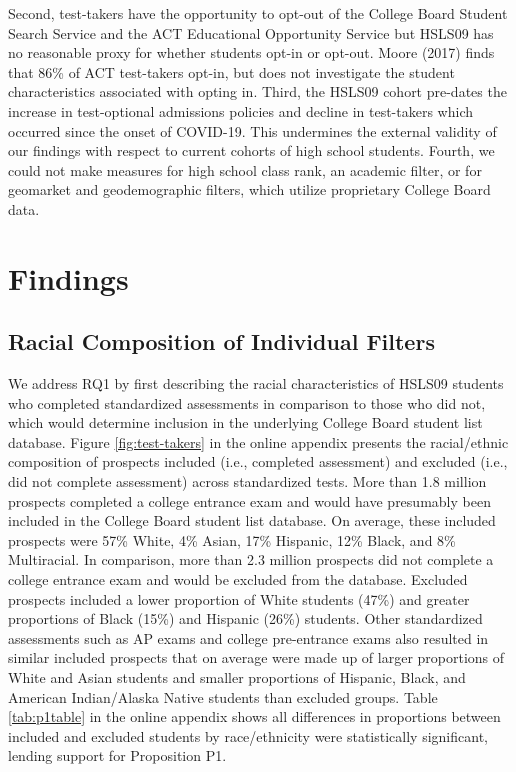 \documentclass[
  12pt,
]{article}
\begin{document}
Second, test-takers have the opportunity to opt-out of the College Board Student Search Service and the ACT Educational Opportunity Service but HSLS09 has no reasonable proxy for whether students opt-in or opt-out. Moore (2017) finds that 86\% of ACT test-takers opt-in, but does not investigate the student characteristics associated with opting in. Third, the HSLS09 cohort pre-dates the increase in test-optional admissions policies and decline in test-takers which occurred since the onset of COVID-19. This undermines the external validity of our findings with respect to current cohorts of high school students. Fourth, we could not make measures for high school class rank, an academic filter, or for geomarket and geodemographic filters, which utilize proprietary College Board data.

\hypertarget{findings}{%
\section{Findings}\label{findings}}

\hypertarget{racial-composition-of-individual-filters}{%
\subsection{Racial Composition of Individual Filters}\label{racial-composition-of-individual-filters}}

We address RQ1 by first describing the racial characteristics of HSLS09 students who completed standardized assessments in comparison to those who did not, which would determine inclusion in the underlying College Board student list database. Figure \ref{fig:test-takers} in the online appendix presents the racial/ethnic composition of prospects included (i.e., completed assessment) and excluded (i.e., did not complete assessment) across standardized tests. More than 1.8 million prospects completed a college entrance exam and would have presumably been included in the College Board student list database. On average, these included prospects were 57\% White, 4\% Asian, 17\% Hispanic, 12\% Black, and 8\% Multiracial. In comparison, more than 2.3 million prospects did not complete a college entrance exam and would be excluded from the database. Excluded prospects included a lower proportion of White students (47\%) and greater proportions of Black (15\%) and Hispanic (26\%) students. Other standardized assessments such as AP exams and college pre-entrance exams also resulted in similar included prospects that on average were made up of larger proportions of White and Asian students and smaller proportions of Hispanic, Black, and American Indian/Alaska Native students than excluded groups. Table \ref{tab:p1table} in the online appendix shows all differences in proportions between included and excluded students by race/ethnicity were statistically significant, lending support for Proposition P1.
\end{document}
